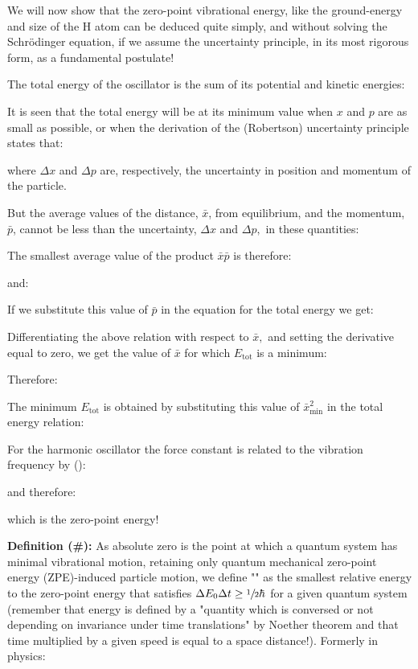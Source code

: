 	We will now show that the zero-point vibrational energy, like the ground-energy and size of the $\mathrm{H}$ atom can be deduced quite simply, and without solving the Schrödinger equation, if we assume the uncertainty principle, in its most rigorous form, as a fundamental postulate!
	
	The total energy of the oscillator is the sum of its potential and kinetic energies:
	
	It is seen that the total energy will be at its minimum value when $x$ and $p$ are as small as possible, or when the  derivation of the (Robertson) uncertainty principle states that:
	
	 where $\Delta x$ and $\Delta p$ are, respectively, the uncertainty in position and momentum of the particle. 
	 
	 But the average values of the distance, $\bar{x}$, from equilibrium, and the momentum, $\bar{p}$, cannot be less than the uncertainty, $\Delta x$ and $\Delta p,$ in these quantities:
	
	The smallest average value of the product $\bar{x} \bar{p}$ is therefore:
	
	and:
	
	If we substitute this value of $\bar{p}$ in the equation for the total energy we get:
	
	Differentiating the above relation with respect to $\bar{x},$ and setting the derivative equal to zero, we get the value of $\bar{x}$ for which $E_{\text{tot}}$ is a minimum:
	
	Therefore:
	
	The minimum $E_{\text{tot}}$ is obtained by substituting this value of $\bar{x}^{2}_{\min}$ in the total energy relation:
	
	For the harmonic oscillator the force constant is related to the vibration frequency by ():
	
	and therefore:
	
	which is the zero-point energy!
	
	\textbf{Definition (\#\mydef):} As absolute zero is the point at which a quantum system has minimal vibrational motion, retaining only quantum mechanical zero-point energy (ZPE)-induced particle motion, we define "" as the smallest relative energy to the zero-point energy that satisfies $\Delta E_0\Delta t\geq \sfrac{1}{2}\hbar$ for a given quantum system (remember that energy is defined by a "quantity which is conversed or not depending on invariance under time translations" by Noether theorem and that time multiplied by a given speed is equal to a space distance!). Formerly in physics:
	
